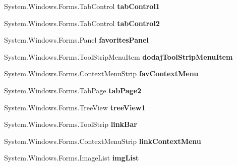 \begin{DoxyCompactItemize}
System.\+Windows.\+Forms.\+Tab\+Control {\bfseries tab\+Control1}
\item 
\mbox{\label{class_windows_forms_app2_1_1_przegladarka_ad3a5df3b81ffdc3098dcc527b4e4bcc2}} 
System.\+Windows.\+Forms.\+Tab\+Control {\bfseries tab\+Control2}
\item 
\mbox{\label{class_windows_forms_app2_1_1_przegladarka_a9f4f2dd866a9feaaf7dc9485c19cfe75}} 
System.\+Windows.\+Forms.\+Panel {\bfseries favorites\+Panel}
\item 
\mbox{\label{class_windows_forms_app2_1_1_przegladarka_a5d68cce2771648ea7792cd0c9c9adea0}} 
System.\+Windows.\+Forms.\+Tool\+Strip\+Menu\+Item {\bfseries dodaj\+Tool\+Strip\+Menu\+Item}
\item 
\mbox{\label{class_windows_forms_app2_1_1_przegladarka_a06f7e91f44509f310e084393ad82b2e3}} 
System.\+Windows.\+Forms.\+Context\+Menu\+Strip {\bfseries fav\+Context\+Menu}
\item 
\mbox{\label{class_windows_forms_app2_1_1_przegladarka_ae3fff43a3e2a7dda4a7841f079a60fd4}} 
System.\+Windows.\+Forms.\+Tab\+Page {\bfseries tab\+Page2}
\item 
\mbox{\label{class_windows_forms_app2_1_1_przegladarka_a8f1855a5829eecb2c52be4d086b2d546}} 
System.\+Windows.\+Forms.\+Tree\+View {\bfseries tree\+View1}
\item 
\mbox{\label{class_windows_forms_app2_1_1_przegladarka_ab7162215196c1e2ea01bb2e1e7678484}} 
System.\+Windows.\+Forms.\+Tool\+Strip {\bfseries link\+Bar}
\item 
\mbox{\label{class_windows_forms_app2_1_1_przegladarka_a58d094443f963458b2a8e5e3e5162d5f}} 
System.\+Windows.\+Forms.\+Context\+Menu\+Strip {\bfseries link\+Context\+Menu}
\item 
\mbox{\label{class_windows_forms_app2_1_1_przegladarka_a993a0596a743eccff0a5a6e487821bcd}} 
System.\+Windows.\+Forms.\+Image\+List {\bfseries img\+List}
\end{DoxyCompactItemize}
